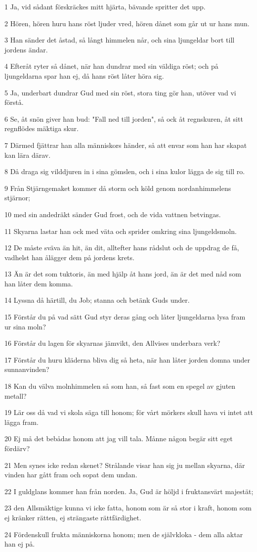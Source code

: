 \par 1 Ja, vid sådant förskräckes mitt hjärta, bävande spritter det upp.
\par 2 Hören, hören huru hans röst ljuder vred, hören dånet som går ut ur hans mun.
\par 3 Han sänder det åstad, så långt himmelen når, och sina ljungeldar bort till jordens ändar.
\par 4 Efteråt ryter så dånet, när han dundrar med sin väldiga röst; och på ljungeldarna spar han ej, då hans röst låter höra sig.
\par 5 Ja, underbart dundrar Gud med sin röst, stora ting gör han, utöver vad vi förstå.
\par 6 Se, åt snön giver han bud: "Fall ned till jorden", så ock åt regnskuren, åt sitt regnflödes mäktiga skur.
\par 7 Därmed fjättrar han alla människors händer, så att envar som han har skapat kan lära därav.
\par 8 Då draga sig vilddjuren in i sina gömslen, och i sina kulor lägga de sig till ro.
\par 9 Från Stjärngemaket kommer då storm och köld genom nordanhimmelens stjärnor;
\par 10 med sin andedräkt sänder Gud frost, och de vida vattnen betvingas.
\par 11 Skyarna lastar han ock med väta och sprider omkring sina ljungeldsmoln.
\par 12 De måste sväva än hit, än dit, alltefter hans rådslut och de uppdrag de få, vadhelst han ålägger dem på jordens krets.
\par 13 Än är det som tuktoris, än med hjälp åt hans jord, än är det med nåd som han låter dem komma.
\par 14 Lyssna då härtill, du Job; stanna och betänk Guds under.
\par 15 Förstår du på vad sätt Gud styr deras gång och låter ljungeldarna lysa fram ur sina moln?
\par 16 Förstår du lagen för skyarnas jämvikt, den Allvises underbara verk?
\par 17 Förstår du huru kläderna bliva dig så heta, när han låter jorden domna under sunnanvinden?
\par 18 Kan du välva molnhimmelen så som han, så fast som en spegel av gjuten metall?
\par 19 Lär oss då vad vi skola säga till honom; för vårt mörkers skull hava vi intet att lägga fram.
\par 20 Ej må det bebådas honom att jag vill tala. Månne någon begär sitt eget fördärv?
\par 21 Men synes icke redan skenet? Strålande visar han sig ju mellan skyarna, där vinden har gått fram och sopat dem undan.
\par 22 I guldglans kommer han från norden. Ja, Gud är höljd i fruktansvärt majestät;
\par 23 den Allsmäktige kunna vi icke fatta, honom som är så stor i kraft, honom som ej kränker rätten, ej strängaste rättfärdighet.
\par 24 Fördenskull frukta människorna honom; men de självkloka - dem alla aktar han ej på.

